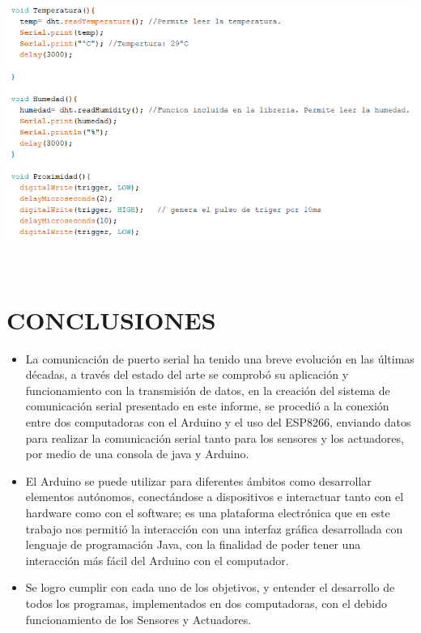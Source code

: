 \documentclass[letterpaper, 10 pt, conference]{ieeeconf}
\begin{document}
\begin{center}
\includegraphics[scale=0.45]{Documento/Figuras/14.PNG}
\begin{scriptsize}
\\ 
\end{scriptsize}
\end{center}

\section{CONCLUSIONES}
  \begin{itemize}

   \item La comunicación de puerto serial ha tenido una breve evolución en las últimas décadas, a través del estado del arte se comprobó su aplicación y funcionamiento con la transmisión de datos, en la creación del sistema de comunicación serial presentado en este informe, se procedió a la conexión entre dos computadoras con el Arduino y el uso del ESP8266, enviando datos para realizar la comunicación serial tanto para los sensores y los actuadores, por medio de una consola de java y Arduino.
     \item El Arduino se puede utilizar para diferentes ámbitos como desarrollar elementos autónomos, conectándose a dispositivos e interactuar tanto con el hardware como con el software; es una plataforma electrónica que en este trabajo nos permitió la interacción con una interfaz gráfica desarrollada con lenguaje de programación Java, con la finalidad de poder tener una interacción más fácil del Arduino con el computador.
     \item Se logro cumplir con cada uno de los objetivos, y entender el desarrollo de todos los programas, implementados en dos computadoras, con el debido funcionamiento de los Sensores y Actuadores.
  \end{itemize}
\end{document}

